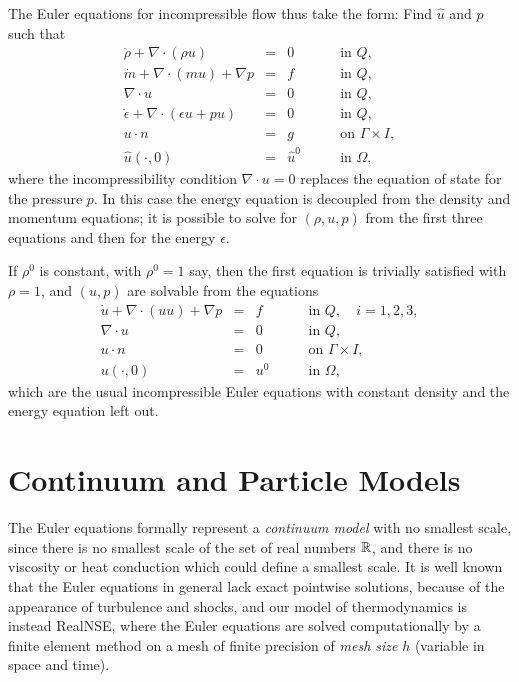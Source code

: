 The Euler equations for incompressible flow thus take the form:
Find $\hat u$ and $p$ such that
\begin{equation}\label{eulerincomp} 
\begin{array}{rcll} 
\dot\rho +\nabla\cdot (\rho u)&=& 0\quad &\mbox{in }Q,\\
\dot m +\nabla\cdot(mu)+ \nabla p &=&  f \quad &\mbox{in } Q, \\ 
\nabla\cdot u&=&0\quad &\mbox{in }Q,\\ 
\dot \epsilon +\nabla\cdot (\epsilon u+pu)&=& 0\quad &\mbox{in }Q,\\
  u\cdot n &=& g   \qquad  &\mbox{on }  \Gamma\times I,\\                       
\hat u(\cdot ,0) &=&  \hat u^0\qquad &\mbox{in }  \Omega , 
\end{array} 
\end{equation}   
where the incompressibility condition $\nabla\cdot u=0$ replaces
the equation of state for the pressure $p$. In this case the
energy equation is decoupled from the density and momentum equations;
it is possible to solve for $(\rho ,u,p)$ from the first three equations
and then for the energy $\epsilon$. 

If $\rho^0$ is constant, with $\rho^0=1$ say, then the first
equation is trivially satisfied with $\rho =1$, and $(u,p)$ are solvable from the equations
\begin{equation}\label{eulerincomp2} 
\begin{array}{rcll} 
\dot u+\nabla\cdot(uu)+ \nabla p &=&  f \quad &\mbox{in } Q,
\quad i=1,2,3, \\ 
\nabla\cdot u&=&0\quad &\mbox{in }Q,\\ 

  u\cdot n &=& 0   \qquad  &\mbox{on }  \Gamma\times I,\\                       
u(\cdot ,0) &=&   u^0\qquad &\mbox{in }  \Omega , 
\end{array} 
\end{equation}   
which are the usual incompressible Euler equations with constant density
and the energy equation left out.




\section{Continuum and Particle Models}

The Euler equations formally represent a \emph{continuum model} with 
no smallest scale, since there is no smallest scale
of the set of real numbers ${\mathbb{R}}$, and there is no viscosity
or heat conduction which could define a smallest scale.
It is well known that the Euler equations in general lack exact pointwise 
solutions, because of the appearance of turbulence and shocks, and our model
of thermodynamics is instead RealNSE, where the Euler equations 
are solved computationally by a finite element method 
on a mesh of finite precision 
of \emph{mesh size}
$h$ (variable in space and time). 

